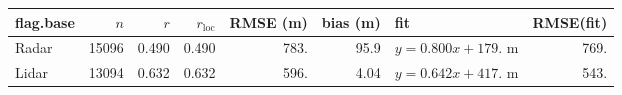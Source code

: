 \documentclass[10pt,notes=all,aspectratio=1610]{beamer}\usepackage[]{graphicx}\usepackage[]{color}
\begin{document}
\begin{frame}[fragile]{\insertsection}
  \begin{adjustbox}{max width=\textwidth}
\begin{tabular}{lrrrrrlr}
  \hline
\hline
flag.base & $n$ & $r$ & $r_\text{loc}$ & RMSE (m) & bias (m) & fit & RMSE(fit) \\ 
  \hline
Radar & 15096 & 0.490 & 0.490 & 783. & 95.9 & $y = 0.800 x + 179.$ m & 769. \\ 
  Lidar & 13094 & 0.632 & 0.632 & 596. & 4.04 & $y = 0.642 x + 417.$ m & 543. \\ 
   \hline
\hline
\end{tabular}

  \end{adjustbox}
\end{frame}
\end{document}
